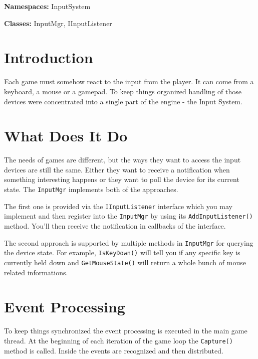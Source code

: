 \noindent\textbf{Namespaces:} InputSystem

\noindent\textbf{Classes:} InputMgr, IInputListener


\section{Introduction}
Each game must somehow react to the input from the player. It can come from a keyboard, a mouse or a gamepad. To keep things organized handling of those devices were concentrated into a single part of the engine - the Input System.


\section{What Does It Do}
The needs of games are different, but the ways they want to access the input devices are still the same. Either they want to receive a notification when something interesting happens or they want to poll the device for its current state. The \verb'InputMgr' implements both of the approaches.

The first one is provided via the \verb'IInputListener' interface which you may implement and then register into the \verb'InputMgr' by using its \verb'AddInputListener()' method. You'll then receive the notification in callbacks of the interface.

The second approach is supported by multiple methods in \verb'InputMgr' for querying the device state. For example, \verb'IsKeyDown()' will tell you if any specific key is currently held down and \verb'GetMouseState()' will return a whole bunch of mouse related informations.


\section{Event Processing}
To keep things synchronized the event processing is executed in the main game thread. At the beginning of each iteration of the game loop the \verb'Capture()' method is called. Inside the events are recognized and then distributed.



%


